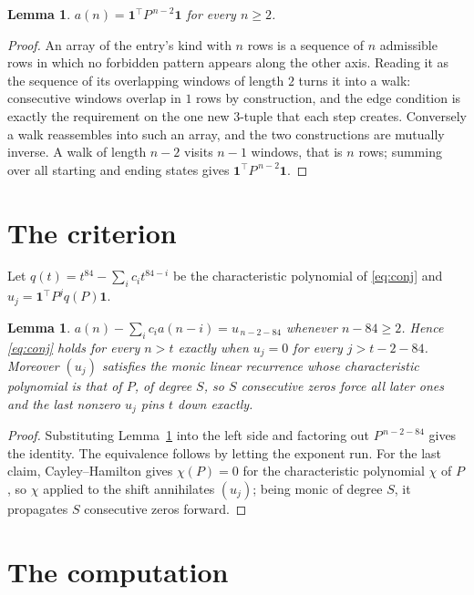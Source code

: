 \documentclass[11pt,a4paper]{article}
\theoremstyle{plain}
\newtheorem{lemma}[theorem]{Lemma}
\theoremstyle{definition}
\begin{document}
\begin{lemma}\label{lem:walk}
$a(n)=\mathbf{1}^{\!\top}P^{\,n-2}\mathbf{1}$ for every $n\ge2$.
\end{lemma}

\begin{proof}
An array of the entry's kind with $n$ rows is a sequence of $n$ admissible rows in
which no forbidden pattern appears along the other axis. Reading it as the sequence of its
overlapping windows of length $2$ turns it into a walk: consecutive windows overlap in
$1$ rows by construction, and the edge condition is exactly the requirement on the one
new $3$-tuple that each step creates. Conversely a walk reassembles into such an array,
and the two constructions are mutually inverse. A walk of length $n-2$ visits $n-1$
windows, that is $n$ rows; summing over all starting and ending states gives
$\mathbf{1}^{\!\top}P^{\,n-2}\mathbf{1}$.
\end{proof}

\section{The criterion}

Let $q(t)=t^{84}-\sum_i c_i t^{84-i}$ be the characteristic polynomial of
\eqref{eq:conj} and $u_j=\mathbf{1}^{\!\top}P^{j}q(P)\mathbf{1}$.

\begin{lemma}\label{lem:crit}
$a(n)-\sum_i c_i a(n-i)=u_{\,n-2-84}$ whenever $n-84\ge2$. Hence
\eqref{eq:conj} holds for every $n>t$ exactly when $u_j=0$ for every
$j>t-2-84$. Moreover $(u_j)$ satisfies the monic linear recurrence whose
characteristic polynomial is that of $P$, of degree $S$, so $S$ consecutive zeros force all
later ones and the last nonzero $u_j$ pins $t$ down exactly.
\end{lemma}

\begin{proof}
Substituting Lemma~\ref{lem:walk} into the left side and factoring out
$P^{\,n-2-84}$ gives the identity. The equivalence follows by letting the exponent
run. For the last claim, Cayley--Hamilton gives $\chi(P)=0$ for the characteristic
polynomial $\chi$ of $P$, so $\chi$ applied to the shift annihilates $(u_j)$; being monic of
degree $S$, it propagates $S$ consecutive zeros forward.
\end{proof}

\section{The computation}
\end{document}
